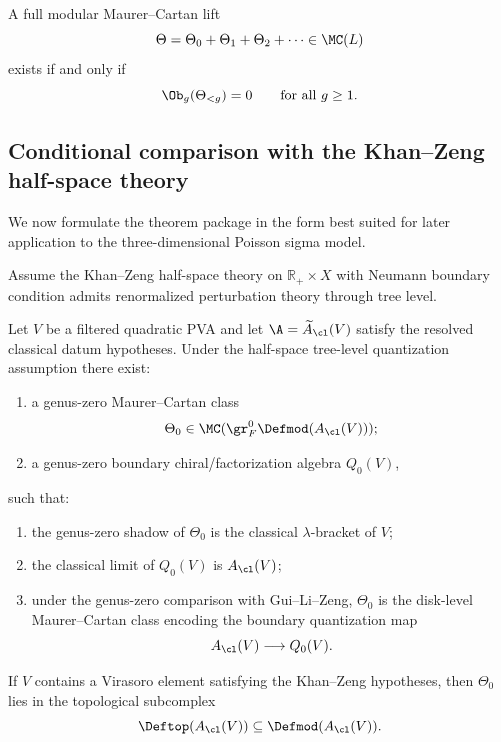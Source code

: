 \begin{corollary}
A full modular Maurer--Cartan lift
\[
\Theta=\Theta_0+\Theta_1+\Theta_2+\cdots\in \MC(L)
\]
exists if and only if
\[
\Ob_g(\Theta_{<g})=0
\qquad\text{for all }g\ge 1.
\]
\end{corollary}

\subsection{Conditional comparison with the Khan--Zeng half-space theory}

We now formulate the theorem package in the form best suited for later application to the
three-dimensional Poisson sigma model.

\begin{assumption}
Assume the Khan--Zeng half-space theory on $\mathbb R_+\times X$ with Neumann boundary
condition admits renormalized perturbation theory through tree level.
\end{assumption}

\begin{theorem}\label{thm:conditional-tree}
Let $V$ be a filtered quadratic PVA and let $\A=\widetilde A_{\cl}(V)$ satisfy the resolved
classical datum hypotheses. Under the half-space tree-level quantization assumption there
exist:
\begin{enumerate}[leftmargin=2.4em]
\item a genus-zero Maurer--Cartan class
\[
\Theta_0\in \MC(\gr_F^0\Defmod(A_{\cl}(V)));
\]
\item a genus-zero boundary chiral/factorization algebra $Q_0(V)$,
\end{enumerate}
such that:
\begin{enumerate}[label=\textnormal{(\alph*)},leftmargin=2.8em]
\item the genus-zero shadow of $\Theta_0$ is the classical $\lambda$-bracket of $V$;
\item the classical limit of $Q_0(V)$ is $A_{\cl}(V)$;
\item under the genus-zero comparison with Gui--Li--Zeng, $\Theta_0$ is the disk-level
Maurer--Cartan class encoding the boundary quantization map
\[
A_{\cl}(V)\longrightarrow Q_0(V).
\]
\end{enumerate}
If $V$ contains a Virasoro element satisfying the Khan--Zeng hypotheses, then $\Theta_0$
lies in the topological subcomplex
\[
\Deftop(A_{\cl}(V))\subseteq \Defmod(A_{\cl}(V)).
\]
\end{theorem}

